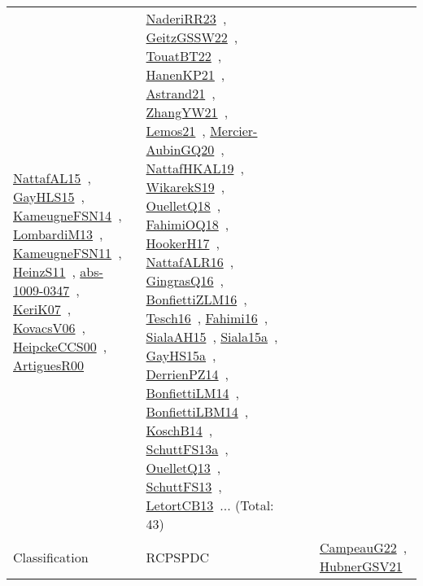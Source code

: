 {\begin{longtable}{lp{3cm}>{\raggedright\arraybackslash}p{6cm}>{\raggedright\arraybackslash}p{6cm}>{\raggedright\arraybackslash}p{8cm}}
\href{works/NattafAL15.pdf}{NattafAL15}~\cite{NattafAL15}, \href{works/GayHLS15.pdf}{GayHLS15}~\cite{GayHLS15}, \href{works/KameugneFSN14.pdf}{KameugneFSN14}~\cite{KameugneFSN14}, \href{works/LombardiM13.pdf}{LombardiM13}~\cite{LombardiM13}, \href{works/KameugneFSN11.pdf}{KameugneFSN11}~\cite{KameugneFSN11}, \href{works/HeinzS11.pdf}{HeinzS11}~\cite{HeinzS11}, \href{works/abs-1009-0347.pdf}{abs-1009-0347}~\cite{abs-1009-0347}, \href{works/KeriK07.pdf}{KeriK07}~\cite{KeriK07}, \href{works/KovacsV06.pdf}{KovacsV06}~\cite{KovacsV06}, \href{works/HeipckeCCS00.pdf}{HeipckeCCS00}~\cite{HeipckeCCS00}, \href{works/ArtiguesR00.pdf}{ArtiguesR00}~\cite{ArtiguesR00} & \href{works/NaderiRR23.pdf}{NaderiRR23}~\cite{NaderiRR23}, \href{works/GeitzGSSW22.pdf}{GeitzGSSW22}~\cite{GeitzGSSW22}, \href{works/TouatBT22.pdf}{TouatBT22}~\cite{TouatBT22}, \href{works/HanenKP21.pdf}{HanenKP21}~\cite{HanenKP21}, \href{works/Astrand21.pdf}{Astrand21}~\cite{Astrand21}, \href{works/ZhangYW21.pdf}{ZhangYW21}~\cite{ZhangYW21}, \href{works/Lemos21.pdf}{Lemos21}~\cite{Lemos21}, \href{works/Mercier-AubinGQ20.pdf}{Mercier-AubinGQ20}~\cite{Mercier-AubinGQ20}, \href{works/NattafHKAL19.pdf}{NattafHKAL19}~\cite{NattafHKAL19}, \href{works/WikarekS19.pdf}{WikarekS19}~\cite{WikarekS19}, \href{works/OuelletQ18.pdf}{OuelletQ18}~\cite{OuelletQ18}, \href{works/FahimiOQ18.pdf}{FahimiOQ18}~\cite{FahimiOQ18}, \href{works/HookerH17.pdf}{HookerH17}~\cite{HookerH17}, \href{works/NattafALR16.pdf}{NattafALR16}~\cite{NattafALR16}, \href{works/GingrasQ16.pdf}{GingrasQ16}~\cite{GingrasQ16}, \href{works/BonfiettiZLM16.pdf}{BonfiettiZLM16}~\cite{BonfiettiZLM16}, \href{works/Tesch16.pdf}{Tesch16}~\cite{Tesch16}, \href{works/Fahimi16.pdf}{Fahimi16}~\cite{Fahimi16}, \href{works/SialaAH15.pdf}{SialaAH15}~\cite{SialaAH15}, \href{works/Siala15a.pdf}{Siala15a}~\cite{Siala15a}, \href{works/GayHS15a.pdf}{GayHS15a}~\cite{GayHS15a}, \href{works/DerrienPZ14.pdf}{DerrienPZ14}~\cite{DerrienPZ14}, \href{works/BonfiettiLM14.pdf}{BonfiettiLM14}~\cite{BonfiettiLM14}, \href{works/BonfiettiLBM14.pdf}{BonfiettiLBM14}~\cite{BonfiettiLBM14}, \href{works/KoschB14.pdf}{KoschB14}~\cite{KoschB14}, \href{works/SchuttFS13a.pdf}{SchuttFS13a}~\cite{SchuttFS13a}, \href{works/OuelletQ13.pdf}{OuelletQ13}~\cite{OuelletQ13}, \href{works/SchuttFS13.pdf}{SchuttFS13}~\cite{SchuttFS13}, \href{works/LetortCB13.pdf}{LetortCB13}~\cite{LetortCB13}... (Total: 43)\\
Classification & RCPSPDC &  &  & \href{works/CampeauG22.pdf}{CampeauG22}~\cite{CampeauG22}, \href{works/HubnerGSV21.pdf}{HubnerGSV21}~\cite{HubnerGSV21}\\

\end{longtable}}
